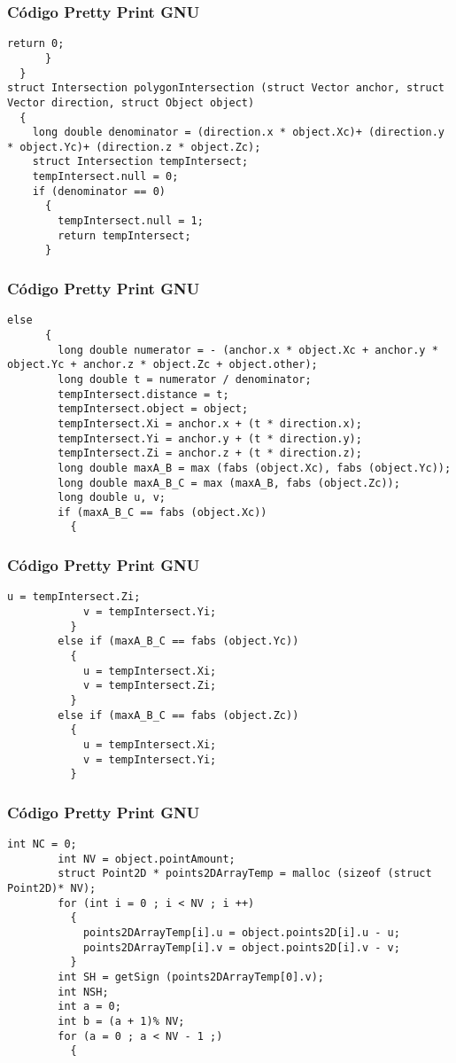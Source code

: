\documentclass{beamer}
\begin{document}
\begin{frame}[fragile]
\frametitle{C\'odigo Pretty Print GNU}
\begin{lstlisting}[style=CStyle]
        return 0;
      }
  }
struct Intersection polygonIntersection (struct Vector anchor, struct Vector direction, struct Object object)
  {
    long double denominator = (direction.x * object.Xc)+ (direction.y * object.Yc)+ (direction.z * object.Zc);
    struct Intersection tempIntersect;
    tempIntersect.null = 0;
    if (denominator == 0)
      {
        tempIntersect.null = 1;
        return tempIntersect;
      }
\end{lstlisting}
\end{frame}
\begin{frame}[fragile]
\frametitle{C\'odigo Pretty Print GNU}
\begin{lstlisting}[style=CStyle]
    else
      {
        long double numerator = - (anchor.x * object.Xc + anchor.y * object.Yc + anchor.z * object.Zc + object.other);
        long double t = numerator / denominator;
        tempIntersect.distance = t;
        tempIntersect.object = object;
        tempIntersect.Xi = anchor.x + (t * direction.x);
        tempIntersect.Yi = anchor.y + (t * direction.y);
        tempIntersect.Zi = anchor.z + (t * direction.z);
        long double maxA_B = max (fabs (object.Xc), fabs (object.Yc));
        long double maxA_B_C = max (maxA_B, fabs (object.Zc));
        long double u, v;
        if (maxA_B_C == fabs (object.Xc))
          {
            \end{lstlisting}
\end{frame}
\begin{frame}[fragile]
\frametitle{C\'odigo Pretty Print GNU}
\begin{lstlisting}[style=CStyle]
            u = tempIntersect.Zi;
            v = tempIntersect.Yi;
          }
        else if (maxA_B_C == fabs (object.Yc))
          {
            u = tempIntersect.Xi;
            v = tempIntersect.Zi;
          }
        else if (maxA_B_C == fabs (object.Zc))
          {
            u = tempIntersect.Xi;
            v = tempIntersect.Yi;
          }
\end{lstlisting}
\end{frame}
\begin{frame}[fragile]
\frametitle{C\'odigo Pretty Print GNU}
\begin{lstlisting}[style=CStyle]
        int NC = 0;
        int NV = object.pointAmount;
        struct Point2D * points2DArrayTemp = malloc (sizeof (struct Point2D)* NV);
        for (int i = 0 ; i < NV ; i ++)
          {
            points2DArrayTemp[i].u = object.points2D[i].u - u;
            points2DArrayTemp[i].v = object.points2D[i].v - v;
          }
        int SH = getSign (points2DArrayTemp[0].v);
        int NSH;
        int a = 0;
        int b = (a + 1)% NV;
        for (a = 0 ; a < NV - 1 ;)
          {
            \end{lstlisting}
\end{frame}
\end{document}
